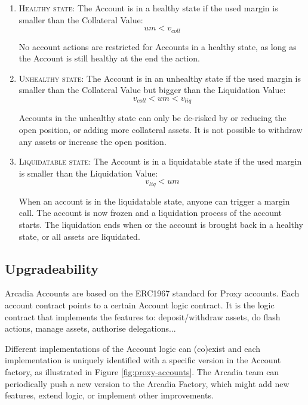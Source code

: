 \documentclass[sigconf,nonacm]{acmart}
\begin{document}
\begin{enumerate}
    \item \textsc{Healthy state:} The Account is in a healthy state if the used margin is smaller than the Collateral Value:
        \begin{equation}
            um < v_{coll}
        \end{equation}

        No account actions are restricted for Accounts in a healthy state, as long as the Account is still healthy at the end the action.
    \item \textsc{Unhealthy state:} The Account is in an unhealthy state if the used margin is smaller than the Collateral Value but bigger than the Liquidation Value:
        \begin{equation}
            v_{coll} < um < v_{liq}
        \end{equation}
        
        Accounts in the unhealthy state can only be de-risked by or reducing the open position, or adding more collateral assets.
        It is not possible to withdraw any assets or increase the open position.
    \item \textsc{Liquidatable state:} The Account is in a liquidatable state if the used margin is smaller than the Liquidation Value:
        \begin{equation}
            v_{liq} < um
        \end{equation}
        
        When an account is in the liquidatable state, anyone can trigger a margin call.
        The account is now frozen and a liquidation process of the account starts.
        The liquidation ends when or the account is brought back in a healthy state, or all assets are liquidated.
\end{enumerate}

\subsection{Upgradeability}
\label{subsec:upgradeability}

Arcadia Accounts are based on the ERC1967 standard for Proxy accounts.
Each account contract points to a certain Account logic contract.
It is the logic contract that implements the features to: deposit/withdraw assets, do flash actions, manage assets, authorise delegations...

Different implementations of the Account logic can (co)exist and each implementation is uniquely identified with a specific version in the Account factory,
as illustrated in Figure \ref{fig:proxy-accounts}.
The Arcadia team can periodically push a new version to the Arcadia Factory, which might add new features, extend logic, or implement other improvements.
\end{document}
